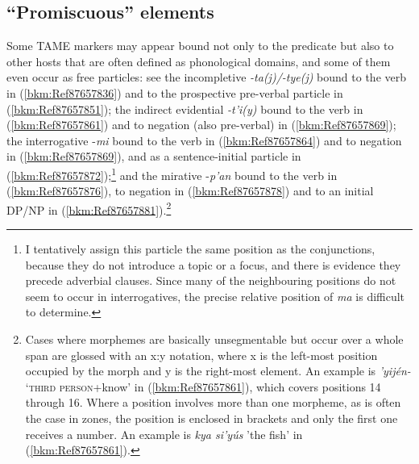 \documentclass[output=paper]{langscibook}
\begin{document}
\subsection{``Promiscuous'' elements}
\label{sec:promiscuouselements}
Some TAME markers may appear bound not only to the predicate but also to other hosts that are often defined as phonological domains, and some of them even occur as free particles: see the incompletive \textit{-ta(j)/-tye(j)} bound to the verb in (\ref{bkm:Ref87657836}) and to the prospective pre-verbal particle in (\ref{bkm:Ref87657851}); the indirect evidential \textit{-t'i(y)} bound to the verb in (\ref{bkm:Ref87657861}) and to negation (also pre-verbal) in (\ref{bkm:Ref87657869}); the interrogative -\textit{mi} bound to the verb in (\ref{bkm:Ref87657864}) and to negation in (\ref{bkm:Ref87657869}), and as a sentence-initial particle in (\ref{bkm:Ref87657872});\footnote{I tentatively assign this particle the same position as the conjunctions, because they do not introduce a topic or a focus, and there is evidence they precede adverbial clauses. Since many of the neighbouring positions do not seem to occur in interrogatives, the precise relative position of \textit{ma} is difficult to determine.} and the mirative -\textit{p'an} bound to the verb in (\ref{bkm:Ref87657876}), to negation in (\ref{bkm:Ref87657878}) and to an initial DP/NP in (\ref{bkm:Ref87657881}).\footnote{Cases where morphemes are basically unsegmentable but occur over a whole span are glossed with an x:y notation, where x is the left-most position occupied by the morph and y is the right-most element. An example is \textit{'yijén-} `\textsc{third person}+know' in (\ref{bkm:Ref87657861}), which covers positions 14 through 16. Where a position involves more than one morpheme, as is often the case in zones, the position is enclosed in brackets and only the first one receives a number. An example is \textit{kya si'yús} 'the fish' in (\ref{bkm:Ref87657861}).}

\end{document}
